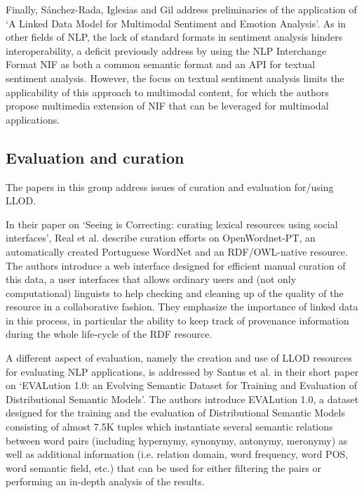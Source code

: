 Finally, Sánchez-Rada, Iglesias and Gil address preliminaries of the application of `A Linked Data Model for Multimodal Sentiment and Emotion Analysis'.
As in other fields of NLP, the lack of standard formats in sentiment analysis hinders interoperability, a deficit previously address by using the NLP Interchange Format NIF as both a common semantic format and an API for textual sentiment analysis. However, the focus on textual sentiment analysis limits the applicability of this approach to multimodal content, for which the authors propose multimedia extension of NIF that can be leveraged for multimodal applications. 

\subsection{Evaluation and curation}

The papers in this group address issues of curation and evaluation for/using LLOD.

In their paper on `Seeing is Correcting: curating lexical resources using social interfaces', Real et al. describe curation efforts on OpenWordnet-PT, an automatically created Portuguese WordNet and an RDF/OWL-native resource. 
The authors introduce a web interface designed for efficient manual curation of this data, a user interfaces that allows ordinary users and (not only computational) linguists to help checking and cleaning up of the quality of the resource in a collaborative fashion. They emphasize the importance of linked data in this process, in particular the ability to keep track of provenance information during the whole life-cycle of the RDF resource.

A different aspect of evaluation, namely the creation and use of LLOD resources for evaluating NLP applications, is addressed by Santus et al. in their short paper on `EVALution 1.0: an Evolving Semantic Dataset for Training and Evaluation of Distributional Semantic Models'. 
The authors introduce EVALution 1.0, a dataset designed for the training and the evaluation of Distributional Semantic Models consisting of almost 7.5K tuples which instantiate several semantic relations between word pairs (including hypernymy, synonymy, antonymy, meronymy) as well as additional information (i.e. relation domain, word frequency, word POS, word semantic field, etc.) that can be used for either filtering the pairs or performing an in-depth analysis of the results. 

